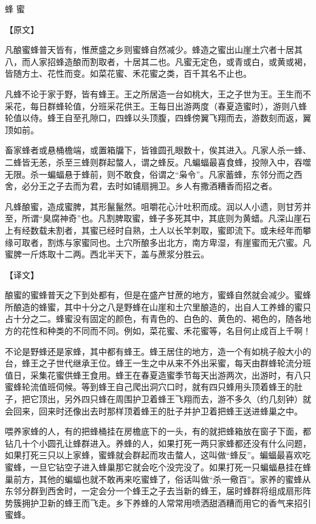 \documentclass[12pt,UTF8]{ctexbook}
\begin{document}
蜂 蜜

【原文】

凡酿蜜蜂普天皆有，惟蔗盛之乡则蜜蜂自然减少。蜂造之蜜出山崖土穴者十居其八，而人家招蜂造酿而割取者，十居其二也。凡蜜无定色，或青或白，或黄或褐，皆随方土、花性而变。如菜花蜜、禾花蜜之类，百千其名不止也。

凡蜂不论于家于野，皆有蜂王。王之所居造一台如桃大，王之子世为王。王生而不采花，每日群蜂轮值，分班采花供王。王每日出游两度（春夏造蜜时），游则八蜂轮值以侍。蜂王自至孔隙口，四蜂以头顶腹，四蜂傍翼飞翔而去，游数刻而返，翼顶如前。

畜家蜂者或悬桶檐端，或置箱牖下，皆锥圆孔眼数十，俟其进入。凡家人杀一蜂、二蜂皆无恙，杀至三蜂则群起螫人，谓之蜂反。凡蝙蝠最喜食蜂，投隙入中，吞噬无限。杀一蝙蝠悬于蜂前，则不敢食，俗谓之“枭令”。凡家蓄蜂，东邻分而之西舍，必分王之子去而为君，去时如铺扇拥卫。乡人有撒酒糟香而招之者。

凡蜂酿蜜，造成蜜脾，其形鬣鬣然。咀嚼花心汁吐积而成。润以人小遗，则甘芳并至，所谓“臭腐神奇”也。凡割脾取蜜，蜂子多死其中，其底则为黄蜡。凡深山崖石上有经数载未割者，其蜜已经时自熟，土人以长竿刺取，蜜即流下。或未经年而攀缘可取者，割炼与家蜜同也。土穴所酿多出北方，南方卑湿，有崖蜜而无穴蜜。凡蜜脾一斤炼取十二两。西北半天下，盖与蔗浆分胜云。

【译文】

酿蜜的蜜蜂普天之下到处都有，但是在盛产甘蔗的地方，蜜蜂自然就会减少。蜜蜂所酿造的蜂蜜，其中十分之八是野蜂在山崖和土穴里酿造的，出自人工养蜂的蜜只占十分之二。蜂蜜没有固定的颜色，有青色的、白色的、黄色的、褐色的，随各地方的花性和种类的不同而不同。例如，菜花蜜、禾花蜜等，名目何止成百上千啊！

不论是野蜂还是家蜂，其中都有蜂王。蜂王居住的地方，造一个有如桃子般大小的台，蜂王之子世代继承王位。蜂王一生之中从来不外出采蜜，每天由群蜂轮流分班值日，采集花蜜供蜂王食用。蜂王在春夏造蜜季节每天出游两次，出游时，有八只蜜蜂轮流值班伺候。等到蜂王自己爬出洞穴口时，就有四只蜂用头顶着蜂王的肚子，把它顶出，另外四只蜂在周围护卫着蜂王飞翔而去，游不多久（约几刻钟）就会回来，回来时还像出去时那样顶着蜂王的肚子并护卫着把蜂王送进蜂巢之中。

喂养家蜂的人，有的把蜂桶挂在房檐底下的一头，有的就把蜂箱放在窗子下面，都钻几十个小圆孔让蜂群进入。养蜂的人，如果打死一两只家蜂都还没有什么问题，如果打死三只以上家蜂，蜜蜂就会群起而攻击螫人，这叫做“蜂反”。蝙蝠最喜欢吃蜜蜂，一旦它钻空子进入蜂巢那它就会吃个没完没了。如果打死一只蝙蝠悬挂在蜂巢前方，其他的蝙蝠也就不敢再来吃蜜蜂了，俗话叫做“杀一儆百”。家养的蜜蜂从东邻分群到西舍时，一定会分一个蜂王之子去当新的蜂王，届时蜂群将组成扇形阵势簇拥护卫新的蜂王而飞走。乡下养蜂的人常常用喷洒甜酒糟而用它的香气来招引蜜蜂。
\end{document}
